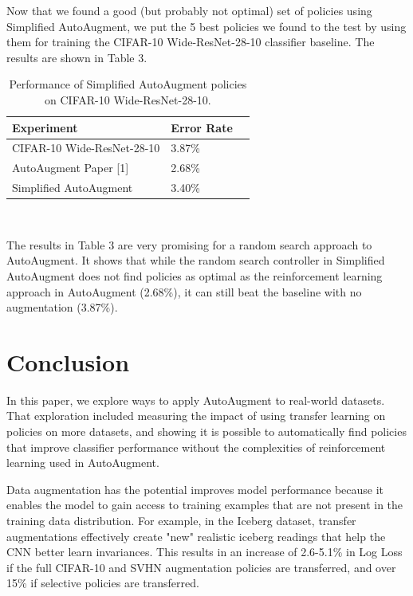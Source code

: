 \documentclass[10pt,twocolumn,letterpaper]{article}
\begin{document}
Now that we found a good (but probably not optimal) set of policies using Simplified AutoAugment, we put the 5 best policies we found to the test by using them for training the CIFAR-10 Wide-ResNet-28-10 classifier baseline.  The results are shown in Table 3.

\vfill\null

    \begin{table}[h]
      \begin{tabular}{lll}
        \hline
        Experiment &Error Rate  \\ \hline
        CIFAR-10 Wide-ResNet-28-10  &3.87\%\\
        AutoAugment Paper [1]  &2.68\% \\
        Simplified AutoAugment &3.40\%\\
        \hline
      \end{tabular}
      \\
      \caption{Performance of Simplified AutoAugment policies on CIFAR-10 Wide-ResNet-28-10.}
    \end{table}


The results in Table 3 are very promising for a random search approach to AutoAugment.  It shows that while the random search controller in Simplified AutoAugment does not find policies as optimal as the reinforcement learning approach in AutoAugment (2.68\%), it can still beat the baseline with no augmentation (3.87\%).   

\section{Conclusion}

In this paper, we explore ways to apply AutoAugment to real-world datasets. That exploration included measuring the impact of using transfer learning on policies on more datasets, and showing it is possible to automatically find policies that improve classifier performance without the complexities of reinforcement learning used in AutoAugment.

Data augmentation has the potential improves model performance because it enables the model to gain access to training examples that are not present in the training data distribution. For example, in the Iceberg dataset, transfer augmentations effectively create "new" realistic iceberg readings that help the CNN better learn invariances.  This results in an increase of 2.6-5.1\% in Log Loss if the full CIFAR-10 and SVHN augmentation policies are transferred, and over 15\% if selective policies are transferred. 
\end{document}
